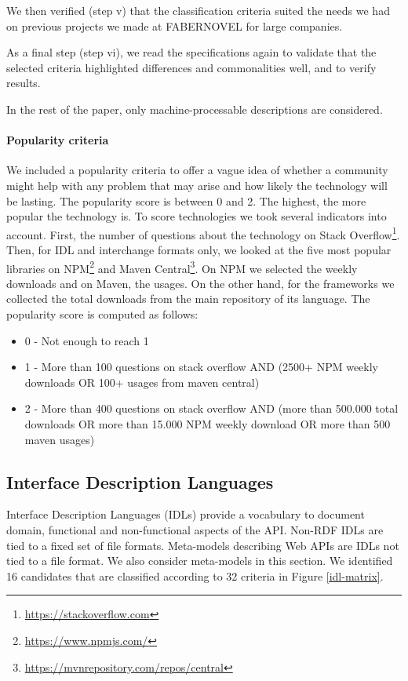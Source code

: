 We then verified (step v) that the classification criteria suited the needs we had on previous projects we made at FABERNOVEL for large companies. %

As a final step (step vi), we read the specifications again to validate that the selected criteria highlighted differences and commonalities well, and to verify results.

In the rest of the paper, only machine-processable descriptions are considered.

\paragraph{Popularity criteria}

We included a popularity criteria to offer a vague idea of whether a community might help with any problem that may arise and how likely the technology will be lasting. The popularity score is between 0 and 2. The highest, the more popular the technology is. To score technologies we took several indicators into account. First, the number of questions about the technology on Stack Overflow\footnote{\url{https://stackoverflow.com}}. Then, for IDL and interchange formats only, we looked at the five most popular libraries on NPM\footnote{\url{https://www.npmjs.com/}} and Maven Central\footnote{\url{https://mvnrepository.com/repos/central}}. On NPM we selected the weekly downloads and on Maven, the usages. On the other hand, for the frameworks we collected the total downloads from the main repository of its language. The popularity score is computed as follows:

\begin{itemize}
    \item 0 - Not enough to reach 1
    \item 1 - More than 100 questions on stack overflow AND (2500+ NPM weekly downloads OR 100+ usages from maven central)
    \item 2 - More than 400 questions on stack overflow AND (more than 500.000 total downloads OR more than 15.000 NPM weekly download OR more than 500 maven usages)
\end{itemize}

\subsection{Interface Description Languages}

Interface Description Languages (IDLs) provide a vocabulary to document domain, functional and non-functional aspects of the API. Non-RDF IDLs are tied to a fixed set of file formats. Meta-models describing Web APIs are IDLs not tied to a file format. We also consider meta-models in this section. We identified 16 candidates that are classified according to 32 criteria in Figure \ref{idl-matrix}.

